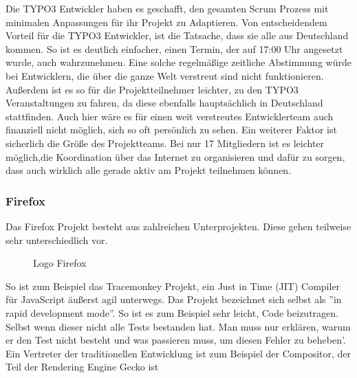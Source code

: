 Die TYPO3 Entwickler haben es geschafft, den gesamten Scrum Prozess mit minimalen Anpassungen
für ihr Projekt zu Adaptieren. Von entscheidendem Vorteil für die TYPO3 Entwickler, ist die
Tatsache, dass sie alle aus Deutschland kommen. So ist es deutlich einfacher, einen Termin, der auf
17:00 Uhr angesetzt wurde, auch wahrzunehmen. Eine solche regelmäßige zeitliche Abstimmung würde bei
Entwicklern, die über die ganze Welt verstreut sind nicht funktionieren. Außerdem ist es so für die
Projektteilnehmer leichter, zu den TYPO3 Veranstaltungen zu fahren, da diese ebenfalls hauptsächlich
in Deutschland stattfinden. Auch hier wäre es für einen weit verstreutes Entwicklerteam
auch finanziell nicht möglich, sich so oft persönlich zu sehen. Ein weiterer Faktor ist sicherlich
die Größe des Projektteams. Bei nur 17 Mitgliedern ist es leichter möglich,die Koordination über das Internet zu  organisieren und dafür zu sorgen, dass auch wirklich alle gerade aktiv am Projekt teilnehmen können.

\subsubsection{Firefox}
Das Firefox Projekt besteht aus zahlreichen Unterprojekten. Diese gehen teilweise sehr unterschiedlich vor.
\begin{figure}[h]
	\centering
	\caption{Logo Firefox}
	\label{fireLogo}
\end{figure}
So ist zum Beispiel das Tracemonkey Projekt, ein Just in Time (JIT) Compiler für JavaScript äußerst agil unterwegs. Das Projekt bezeichnet sich selbst als ''in rapid development mode''\cite{bib:trm}. So ist es zum Beispiel sehr leicht, Code beizutragen. Selbst wenn dieser nicht alle Tests bestanden hat. Man muss nur erklären, warum er den Test nicht besteht und was passieren muss, um diesen Fehler zu beheben'\cite{bib:trm}. Ein Vertreter der traditionellen Entwicklung ist zum Beispiel der Compositor, der  Teil der Rendering Engine Gecko ist \cite{bib:beltzner}

